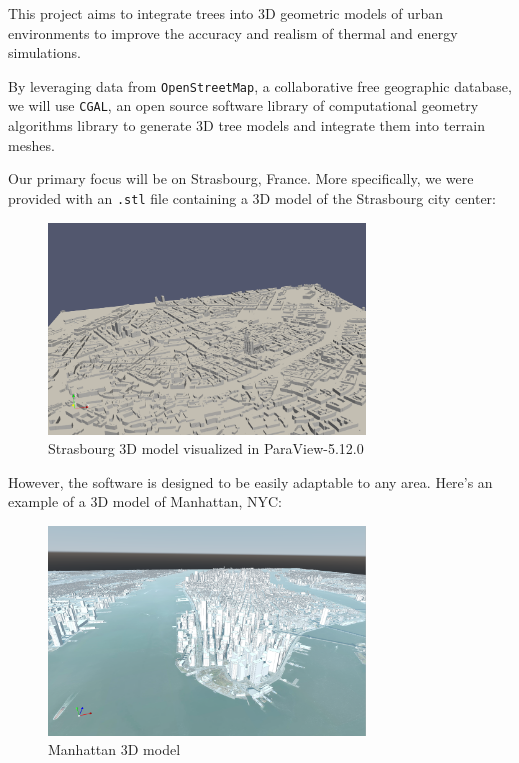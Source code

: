 \documentclass[12pt]{article}
\begin{document}
This project aims to integrate trees into 3D geometric models of urban
environments to improve the accuracy and realism of thermal and energy
simulations.

By leveraging data from \texttt{OpenStreetMap}\cite{openstreetmap}, a
collaborative free geographic database, we will use \texttt{CGAL}\cite{cgal},
an open source software library of computational geometry algorithms library to
generate 3D tree models and integrate them into terrain meshes.

Our primary focus will be on Strasbourg, France. More specifically, we were
provided with an \texttt{.stl}\cite{stl} file containing a 3D model of the
Strasbourg city center:

\begin{figure}[H]
    \centering
    \includegraphics[width=0.75\textwidth]{images/stras_mesh.png}
    \caption{Strasbourg 3D model visualized in ParaView-5.12.0\cite{paraview}}
\end{figure}

However, the software is designed to be easily adaptable to any area.
Here's an example of a 3D model of Manhattan, NYC:

\begin{figure}[H]
    \centering
    \includegraphics[width=0.75\textwidth]{images/manhattan_mesh.png}
    \caption{Manhattan 3D model}
\end{figure}
\end{document}
